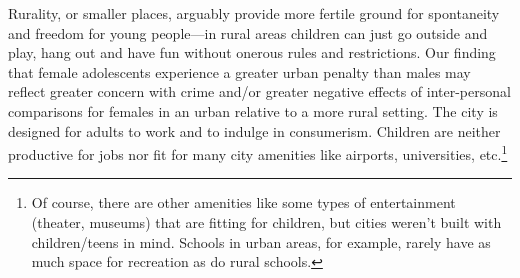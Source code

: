 \documentclass[10pt, letterpaper]{article}
\begin{document}
\begin{spacing}{1.4}
Rurality, or smaller places, arguably provide more fertile ground for
spontaneity and freedom for young people---in rural areas children can just go outside
and play, hang out and have fun without onerous rules and restrictions. Our finding that female adolescents experience a greater urban penalty than males may reflect
greater concern with crime and/or greater negative effects of inter-personal comparisons for females in an urban
relative to a more rural setting. %
The city is designed for  adults to work and to indulge in consumerism. Children are
neither productive for jobs nor fit for many city amenities like airports,
universities, etc.\footnote{Of course, there are other amenities like some types
  of entertainment (theater, museums) that are fitting for children, but cities
  weren't built with children/teens in mind. Schools in urban areas, for
  example, rarely have as much space for recreation as do rural schools.} 

\end{spacing}
\end{document}
